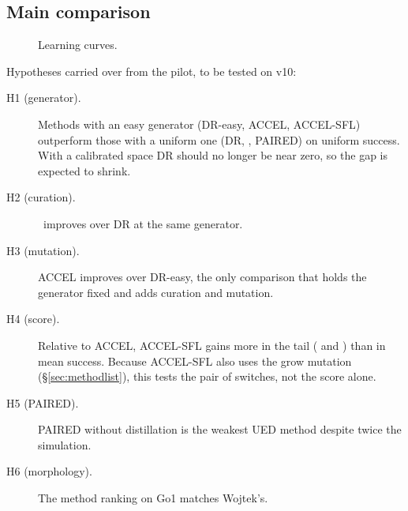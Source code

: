 \subsection{Main comparison}
\label{sec:main}

\begin{table}[t]
  \centering\small
  \caption{Success rate (\%) of the deterministic policy on the v10 level
  space, mean $\pm$ std over 3 seeds; best per column in bold. Uniform:
  levels drawn from the full 8-parameter space; : its worst
  25\% of levels (cross-fitted between two passes); Solvable: uniform
  levels at least one run passes (cross-fitted); OOD suite: held-out
  structured terrains; Flat: no terrain.}
  \label{tab:main}
\end{table}

\begin{figure}[t]
  \centering
  \caption{Learning curves.}
  \label{fig:curves}
\end{figure}

Hypotheses carried over from the pilot, to be tested on v10:
\begin{description}
  \item[H1 (generator).] Methods with an easy generator (DR-easy, ACCEL,
    ACCEL-SFL) outperform those with a uniform one (DR, \plr, PAIRED) on
    uniform success. With a calibrated space DR should no longer be near
    zero, so the gap is expected to shrink.
  \item[H2 (curation).] \plr\ improves over DR at the same generator.
  \item[H3 (mutation).] ACCEL improves over DR-easy, the only comparison
    that holds the generator fixed and adds curation and mutation.
  \item[H4 (score).] Relative to ACCEL, ACCEL-SFL gains more in the
    tail ( and ) than in mean success.
    Because ACCEL-SFL also uses the grow mutation
    (\S\ref{sec:methodlist}), this tests the pair of switches, not the
    score alone.
  \item[H5 (PAIRED).] PAIRED without distillation is the weakest UED
    method despite twice the simulation.
  \item[H6 (morphology).] The method ranking on Go1 matches Wojtek's.
\end{description}

